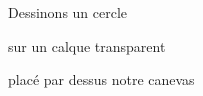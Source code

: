 \documentclass[preview]{standalone}
\begin{document}
\begin{center}
Dessinons un cercle
        
sur un calque transparent

placé par dessus notre canevas
\end{center}
\end{document}
